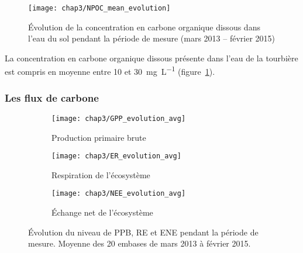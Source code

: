 
\begin{figure}
\centering
\texttt{[image: chap3/NPOC\_mean\_evolution]}
\caption{Évolution de la concentration en carbone organique dissous dans l'eau du sol pendant la période de mesure (mars 2013 -- février 2015)}
\label{fig:NPOC_mean_evolution}
\end{figure}

La concentration en carbone organique dissous présente dans l'eau de la tourbière est compris en moyenne entre \num{10} et \SI{30}{\milli\gram\per\liter} (figure~\ref{fig:NPOC_mean_evolution}).


\subsubsection{Les flux de carbone}

\begin{figure}
	\centering
	\begin{subfigure}[t]{\textwidth}
		\centering
		\texttt{[image: chap3/GPP\_evolution\_avg]}
		\caption{Production primaire brute}
		\label{fig:GPP_evolution_avg}
	\end{subfigure}%
	
	\begin{subfigure}[t]{\textwidth}
		\centering
		\texttt{[image: chap3/ER\_evolution\_avg]}
		\caption{Respiration de l'écosystème}
		\label{fig:ER_evolution_avg}
	\end{subfigure}
	
	\begin{subfigure}[t]{\textwidth}
		\centering
		\texttt{[image: chap3/NEE\_evolution\_avg]}
		\caption{Échange net de l'écosystème}
		\label{fig:NEE_evolution_avg}
	\end{subfigure}
\caption{Évolution du niveau de PPB, RE et ENE pendant la période de mesure. Moyenne des 20 embases de mars 2013 à février 2015.}
\label{fig:flux_evolution_avg}
\end{figure}

